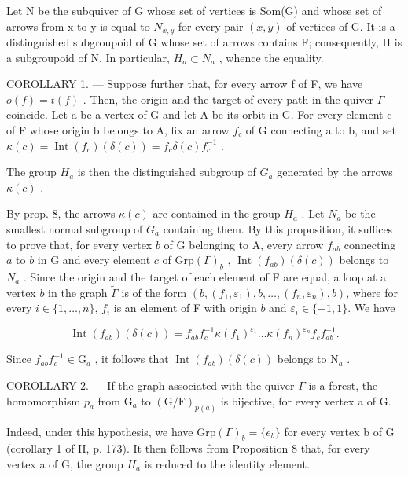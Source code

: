 Let N be the subquiver of G whose set of vertices is Som(G) and whose set of arrows from x to y is equal to \(N_{x,y}\) for every pair \((x,y)\) of vertices of G. It is a distinguished subgroupoid of G whose set of arrows contains F; consequently, H is a subgroupoid of N. In particular, \(H_{a} \subset N_{a}\) , whence the equality.

COROLLARY 1. --- Suppose further that, for every arrow f of F, we have \(o(f) = t(f)\) . Then, the origin and the target of every path in the quiver \(\Gamma\) coincide. Let a be a vertex of G and let A be its orbit in G. For every element c of F whose origin b belongs to A, fix an arrow \(f_{c}\) of G connecting a to b, and set \(\kappa(c) = \operatorname{Int}(f_{c})(\delta(c)) = f_{c}\delta(c)f_{c}^{-1}\) .

The group \(H_{a}\) is then the distinguished subgroup of \(G_{a}\) generated by the arrows \(\kappa(c)\) .

By prop. 8, the arrows \(\kappa(c)\) are contained in the group \(H_a\) . Let \(N_a\) be the smallest normal subgroup of \(G_a\) containing them. By this proposition, it suffices to prove that, for every vertex \(b\) of G belonging to A, every arrow \(f_{ab}\) connecting \(a\) to \(b\) in G and every element \(c\) of \(\mathrm{Grp}(\Gamma)_b\) , \(\operatorname{Int}(f_{ab})(\delta(c))\) belongs to \(N_a\) . Since the origin and the target of each element of F are equal, a loop at a vertex \(b\) in the graph \(\widetilde{\Gamma}\) is of the form \((b,(f_1,\varepsilon_1),b,\ldots,(f_n,\varepsilon_n),b)\), where for every \(i\in\{1,\ldots,n\}\), \(f_i\) is an element of F with origin \(b\) and \(\varepsilon_i\in\{-1,1\}\). We have

\[
\operatorname{Int} (f _ {a b}) (\delta (c)) = f _ {a b} f _ {c} ^ {- 1} \kappa (f _ {1}) ^ {\varepsilon_ {1}} \dots \kappa (f _ {n}) ^ {\varepsilon_ {n}} f _ {c} f _ {a b} ^ {- 1}.
\]

Since \(f_{ab}f_c^{-1} \in \mathrm{G}_a\) , it follows that \(\operatorname{Int}(f_{ab})(\delta(c))\) belongs to \(\mathrm{N}_a\) .

COROLLARY 2. --- If the graph associated with the quiver \(\Gamma\) is a forest, the homomorphism \(p_a\) from \(\mathrm{G}_a\) to \((\mathrm{G} / \mathrm{F})_{p(a)}\) is bijective, for every vertex a of G.

Indeed, under this hypothesis, we have \(\mathrm{Grp}(\Gamma)_{b}=\{e_{b}\}\) for every vertex b of G (corollary 1 of II, p. 173). It then follows from Proposition 8 that, for every vertex a of G, the group \(H_{a}\) is reduced to the identity element.

